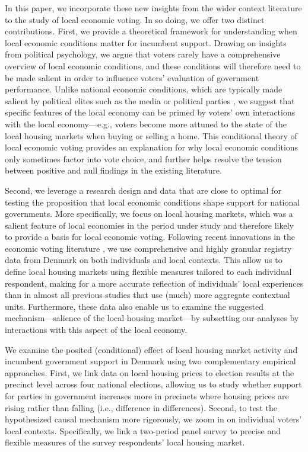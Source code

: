 \documentclass[12pt,a4paper]{article}
\begin{document}
	In this paper, we incorporate these new insights from the wider context literature to the study of local economic voting. In so doing, we offer two distinct contributions. First, we provide a theoretical framework for understanding when local economic conditions matter for incumbent support. Drawing on insights from political psychology, we argue that voters rarely have a comprehensive overview of local economic conditions, and these conditions will therefore need to be made salient in order to influence voters’ evaluation of government performance. Unlike national economic conditions, which are typically made salient by political elites such as the media \citep{hart2013can} or political parties \citep{bisgaard2017partisan}, we suggest that specific features of the local economy can be primed by voters’ own interactions with the local economy—e.g., voters become more attuned to the state of the local housing markets when buying or selling a home. This conditional theory of local economic voting provides an explanation for why local economic conditions only sometimes factor into vote choice, and further helps resolve the tension between positive and null findings in the existing literature.
	
	Second, we leverage a research design and data that are close to optimal for testing the proposition that local economic conditions shape support for national governments. More specifically, we focus on local housing markets, which was a salient feature of local economies in the period under study and therefore likely to provide a basis for local economic voting. Following recent innovations in the economic voting literature \citep{healy2017digging}, we use comprehensive and highly granular registry data from Denmark on both individuals and local contexts. This allow us to define local housing markets using flexible measures tailored to each individual respondent, making for a more accurate reflection of individuals’ local experiences than in almost all previous studies that use (much) more aggregate contextual units. Furthermore, these data also enable us to examine the suggested mechanism—salience of the local housing market—by subsetting our analyses by interactions with this aspect of the local economy.  
	
	We examine the posited (conditional) effect of local housing market activity and incumbent government support in Denmark using two complementary empirical approaches. First, we link data on local housing prices to election results at the precinct level across four national elections, allowing us to study whether support for parties in government increases more in precincts where housing prices are rising rather than falling (i.e., difference in differences). Second, to test the hypothesized causal mechanism more rigorously, we zoom in on individual voters' local contexts. Specifically, we link a two-period panel survey to precise and flexible measures of the survey respondents’ local housing market.
	
\end{document}
